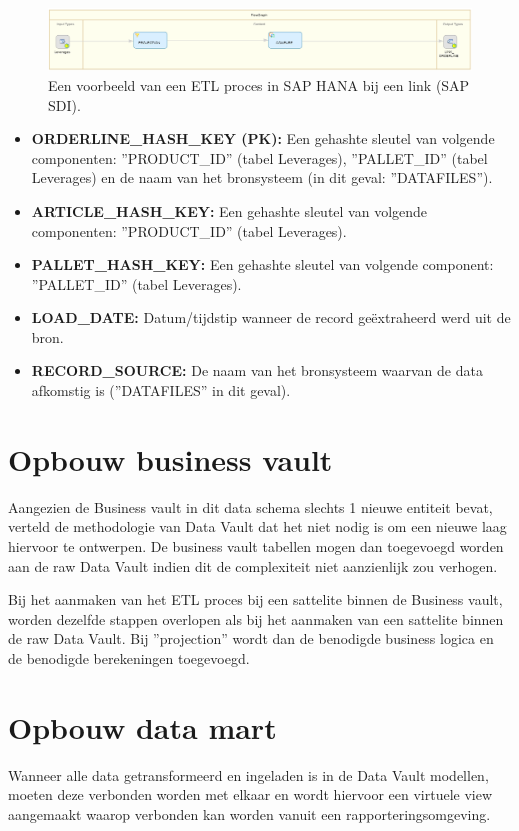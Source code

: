 \begin{figure}[h]
	\centering
	\includegraphics[scale=0.45]{../images/DV_FG_link.png}
	\caption{Een voorbeeld van een ETL proces in SAP HANA bij een link (SAP SDI).}
	\label{fig:etllink}
\end{figure}

\begin{itemize}
	\item \textbf{ORDERLINE\_HASH\_KEY (PK):} Een gehashte sleutel van volgende componenten: ''PRODUCT\_ID'' (tabel Leverages), ''PALLET\_ID'' (tabel Leverages)  en de naam van het bronsysteem (in dit geval: ''DATAFILES'').
	\item \textbf{ARTICLE\_HASH\_KEY:} Een gehashte sleutel van volgende componenten: ''PRODUCT\_ID'' (tabel Leverages).
	\item \textbf{PALLET\_HASH\_KEY:} Een gehashte sleutel van volgende component: ''PALLET\_ID'' (tabel Leverages).
	\item \textbf{LOAD\_DATE:} Datum/tijdstip wanneer de record geëxtraheerd werd uit de bron.
	\item \textbf{RECORD\_SOURCE:} De naam van het bronsysteem waarvan de data afkomstig is (''DATAFILES'' in dit geval).
\end{itemize}

\section{Opbouw business vault}
Aangezien de Business vault in dit data schema slechts 1 nieuwe entiteit bevat, verteld de methodologie van Data Vault dat het niet nodig is om een nieuwe laag hiervoor te ontwerpen. De business vault tabellen mogen dan toegevoegd worden aan de raw Data Vault indien dit de complexiteit niet aanzienlijk zou verhogen.

Bij het aanmaken van het ETL proces bij een sattelite binnen de Business vault, worden dezelfde stappen overlopen als bij het aanmaken van een sattelite binnen de raw Data Vault. Bij ''projection'' wordt dan de benodigde business logica en de benodigde berekeningen toegevoegd.

\section{Opbouw data mart}
Wanneer alle data getransformeerd en ingeladen is in de Data Vault modellen, moeten deze verbonden worden met elkaar en wordt hiervoor een virtuele view aangemaakt waarop verbonden kan worden vanuit een rapporteringsomgeving.

